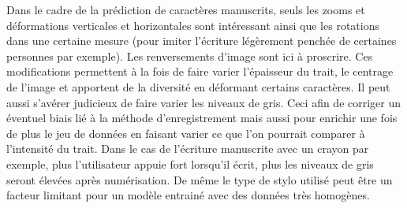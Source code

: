 Dans le cadre de la prédiction de caractères manuscrits, seuls les zooms et 
déformations verticales et horizontales sont intéressant ainsi que les rotations dans une 
certaine mesure (pour imiter l'écriture légèrement penchée de certaines personnes par 
exemple). Les renversements d'image sont ici à proscrire. Ces modifications 
permettent à la fois de faire varier l'épaisseur du trait, le centrage de l'image et 
apportent de la diversité en déformant certains caractères. Il peut aussi s'avérer judicieux
de faire varier les niveaux de gris. Ceci afin de corriger un éventuel biais lié à la 
méthode d'enregistrement mais aussi pour enrichir une fois de plus le jeu de données en 
faisant varier ce que l'on pourrait comparer à l'intensité du trait. Dans le cas de 
l'écriture manuscrite avec un crayon par exemple, plus l'utilisateur appuie fort lorsqu'il 
écrit, plus les niveaux de gris seront élevées après numérisation. De même le type de 
stylo utilisé peut être un facteur limitant pour un modèle entrainé avec des données
très homogènes.
